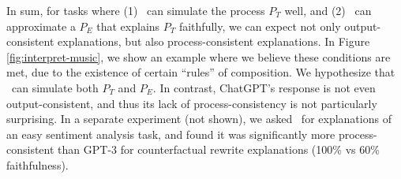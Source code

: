 

In sum, for tasks where (1) \DV\ can simulate the process $P_T$ well, and (2) \DV\ can approximate a $P_E$ that explains $P_T$ faithfully, we can expect not only output-consistent explanations, but also process-consistent explanations.
In Figure \ref{fig:interpret-music}, we show an example where we believe these conditions are met, due to the existence of certain ``rules'' of composition. We hypothesize that \DV\ can simulate both $P_T$ and $P_E$.
In contrast, ChatGPT's response is not even output-consistent, and thus its lack of process-consistency is not particularly surprising. In a separate experiment (not shown), we asked \DV\ for explanations of an easy sentiment analysis task, and found it was significantly more process-consistent than GPT-3 for counterfactual rewrite explanations (100\% vs 60\% faithfulness).

